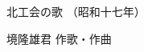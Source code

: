 \documentclass[10pt,b5j]{tarticle} %
\begin{document}
\begin{minipage}[c]{0.7\hsize} %
    \begin{center}
        {\LARGE
            北工会の歌 %
        }
        {\small 
            （昭和十七年） %
        }
    \end{center}
\end{minipage}
\begin{minipage}[c]{0.3\hsize} %
    \begin{flushright} %
        境隆雄君 作歌・作曲 %
    \end{flushright}
\end{minipage}
\end{document}
